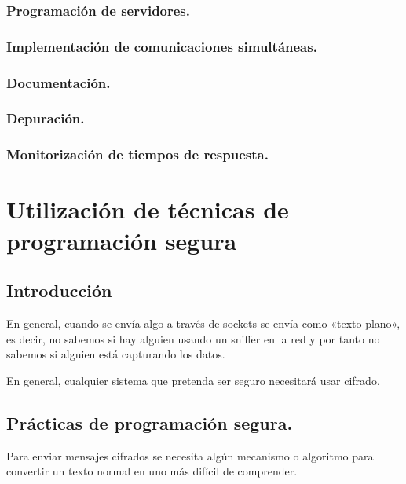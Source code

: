 \documentclass[letterpaper,10pt,spanish]{sphinxmanual}
\begin{document}
\subsection{Programación de servidores.}
\label{\detokenize{textos/tema4:programacion-de-servidores}}

\subsection{Implementación de comunicaciones simultáneas.}
\label{\detokenize{textos/tema4:implementacion-de-comunicaciones-simultaneas}}

\subsection{Documentación.}
\label{\detokenize{textos/tema4:documentacion}}

\subsection{Depuración.}
\label{\detokenize{textos/tema4:depuracion}}

\subsection{Monitorización de tiempos de respuesta.}
\label{\detokenize{textos/tema4:monitorizacion-de-tiempos-de-respuesta}}

\chapter{Utilización de técnicas de programación segura}
\label{\detokenize{textos/tema5:utilizacion-de-tecnicas-de-programacion-segura}}\label{\detokenize{textos/tema5::doc}}

\section{Introducción}
\label{\detokenize{textos/tema5:introduccion}}
En general, cuando se envía algo a través de sockets se envía como «texto plano», es decir, no sabemos si hay alguien usando un sniffer en la red y por tanto no sabemos si alguien está capturando los datos.

En general, cualquier sistema que pretenda ser seguro necesitará usar cifrado.


\section{Prácticas de programación segura.}
\label{\detokenize{textos/tema5:practicas-de-programacion-segura}}
Para enviar mensajes cifrados se necesita algún mecanismo o algoritmo para convertir un texto normal en uno más difícil de comprender.
\end{document}
